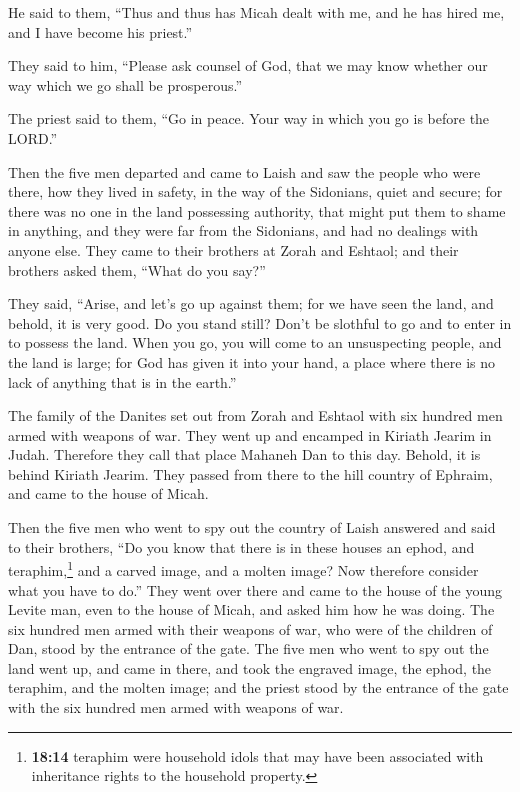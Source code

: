  He said to them, ``Thus and thus has Micah dealt with me,
and he has hired me, and I have become his priest.''

 They said to him, ``Please ask counsel of God, that we
may know whether our way which we go shall be prosperous.''

 The priest said to them, ``Go in peace. Your way in which
you go is before the LORD.''

 Then the five men departed and came to Laish and saw the
people who were there, how they lived in safety, in the way of the
Sidonians, quiet and secure; for there was no one in the land possessing
authority, that might put them to shame in anything, and they were far
from the Sidonians, and had no dealings with anyone else. 
They came to their brothers at Zorah and Eshtaol; and their brothers
asked them, ``What do you say?''

 They said, ``Arise, and let's go up against them; for we
have seen the land, and behold, it is very good. Do you stand still?
Don't be slothful to go and to enter in to possess the land.
 When you go, you will come to an unsuspecting people,
and the land is large; for God has given it into your hand, a place
where there is no lack of anything that is in the earth.''

 The family of the Danites set out from Zorah and Eshtaol
with six hundred men armed with weapons of war.  They
went up and encamped in Kiriath Jearim in Judah. Therefore they call
that place Mahaneh Dan to this day. Behold, it is behind Kiriath Jearim.
 They passed from there to the hill country of Ephraim,
and came to the house of Micah.

 Then the five men who went to spy out the country of
Laish answered and said to their brothers, ``Do you know that there is
in these houses an ephod, and teraphim,\footnote{\textbf{18:14} teraphim
  were household idols that may have been associated with inheritance
  rights to the household property.} and a carved image, and a molten
image? Now therefore consider what you have to do.'' 
They went over there and came to the house of the young Levite man, even
to the house of Micah, and asked him how he was doing. 
The six hundred men armed with their weapons of war, who were of the
children of Dan, stood by the entrance of the gate.  The
five men who went to spy out the land went up, and came in there, and
took the engraved image, the ephod, the teraphim, and the molten image;
and the priest stood by the entrance of the gate with the six hundred
men armed with weapons of war.

